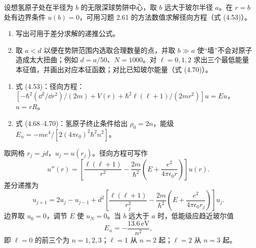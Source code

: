 \begin{question}
设想氢原子处在半径为 $b$ 的无限深球势阱中心，取 $b$ 远大于玻尔半径 $a$。在 $r=b$ 处有边界条件 $u(b)=0$，可用习题 2.61 的方法数值求解径向方程（式 (4.53)）。
\begin{enumerate}
\item 写出可用于差分求解的递推公式。
\item 取 $a<d$ 以便在势阱范围内选取合理数量的点，并取 $b\gg a$ 使“墙”不会对原子造成太大扭曲；例如 $d=a/50$、$N=1000$。对 $\ell=0,1,2$ 求出三个最低能量本征值，并画出对应本征函数；对比已知玻尔能量（式 (4.70)）。
\end{enumerate}

\par\smallskip
{}
\begin{enumerate}[leftmargin=2.2em,itemsep=0.12em,topsep=0.12em,parsep=0pt]
\item 式 (4.53)：径向方程：$[-\hbar^2(\dd^2/\dd r^2)/(2m)+V(r)+\hbar^2\ell(\ell+1)/(2mr^2)]u=Eu$，$u=rR$。
\item 式 (4.68--4.70)：氢原子终止条件给出 $\rho_0=2n$，能级 $E_n=-me^4/[2(4\pi\epsilon_0)^2\hbar^2n^2]$。
\end{enumerate}

\end{question}
\begin{solution}

取网格 $r_j=jd$，$u_j=u(r_j)$。径向方程可写作
\[
u''(r)=\left[\frac{\ell(\ell+1)}{r^2}-\frac{2m}{\hbar^2}\left(E+\frac{e^2}{4\pi\epsilon_0r}\right)\right]u(r).
\]
差分递推为
\[
u_{j+1}=2u_j-u_{j-1}+d^2\left[\frac{\ell(\ell+1)}{r_j^2}-\frac{2m}{\hbar^2}\left(E+\frac{e^2}{4\pi\epsilon_0r_j}\right)\right]u_j.
\]
边界取 $u_0=0$，调节 $E$ 使 $u_N=0$。当 $b$ 远大于 $a$ 时，低能级应趋近玻尔值
\[
E_n=-\frac{13.6\,\mathrm{eV}}{n^2},
\]
即 $\ell=0$ 的前三个为 $n=1,2,3$；$\ell=1$ 从 $n=2$ 起；$\ell=2$ 从 $n=3$ 起。

\end{solution}

